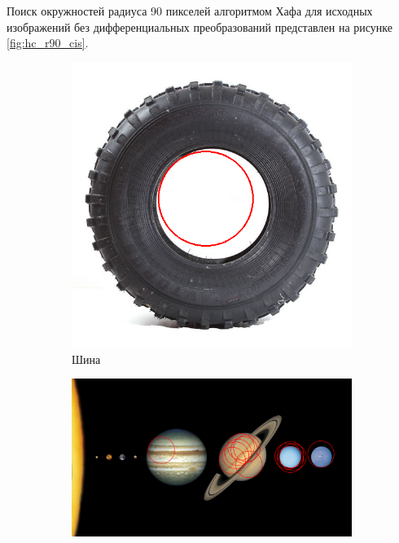 \documentclass[a4paper, 16pt]{article}
\begin{document}
    \noindent Поиск окружностей радиуса 90 пикселей алгоритмом Хафа для исходных изображений без дифференциальных преобразований представлен на рисунке \ref{fig:hc_r90_cis}.
    \begin{figure}[htbp]
        \centering
        \begin{subfigure}{0.3\textwidth}
            \centering
            \includegraphics[scale=0.15]{hc_r=90_ci1.png}
            \caption{Шина}
            \label{fig:hc_r90_ci1}
        \end{subfigure}
        \hfill
        \begin{subfigure}{0.3\textwidth}
            \centering
            \includegraphics[width=\linewidth]{hc_r=90_ci2.png}

\end{subfigure}
\end{figure}
\end{document}
